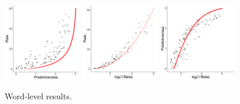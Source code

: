\documentclass[11pt,letterpaper]{article}
\begin{document}
\begin{figure}
\begin{center}
		\includegraphics[width=0.3\textwidth]{code/figures/ar-words-info-fitted.pdf}
\includegraphics[width=0.3\textwidth]{code/figures/ar-words-nlogbeta-mem-fitted.pdf}
\includegraphics[width=0.3\textwidth]{code/figures/ar-words-nlogbeta-ee-fitted.pdf}
	\end{center}
	\caption{Word-level results.}\label{fig:wordlevel-fit-1}
\end{figure}
\end{document}
